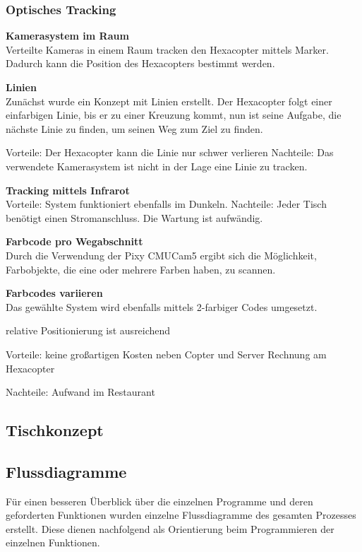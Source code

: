     \subsubsection{Optisches Tracking}


      \textbf{Kamerasystem im Raum}\\
      Verteilte Kameras in einem Raum tracken den Hexacopter mittels Marker. Dadurch kann die Position des Hexacopters bestimmt werden.


      \textbf{Linien}\\
      Zunächst wurde ein Konzept mit Linien erstellt. Der Hexacopter folgt einer einfarbigen Linie, bis er zu einer Kreuzung kommt, nun ist seine Aufgabe, die nächste Linie zu finden, um seinen Weg zum Ziel zu finden.

      Vorteile: Der Hexacopter kann die Linie nur schwer verlieren
      Nachteile: Das verwendete Kamerasystem ist nicht in der Lage eine Linie zu tracken.

      \textbf{Tracking mittels Infrarot}\\


      Vorteile:
      System funktioniert ebenfalls im Dunkeln.
      Nachteile:
      Jeder Tisch benötigt einen Stromanschluss.
      Die Wartung ist aufwändig.

      \textbf{Farbcode pro Wegabschnitt}\\
      Durch die Verwendung der Pixy CMUCam5 ergibt sich die Möglichkeit, Farbobjekte, die eine oder mehrere Farben haben, zu scannen.



      \textbf{Farbcodes variieren}\\
      Das gewählte System wird ebenfalls mittels 2-farbiger Codes umgesetzt.


      relative Positionierung ist ausreichend

      Vorteile:
      keine großartigen Kosten neben Copter und Server
      Rechnung am Hexacopter

      Nachteile:
      Aufwand im Restaurant



  \subsection{Tischkonzept}



  \subsection{Flussdiagramme}
  Für einen besseren Überblick über die einzelnen Programme und deren geforderten Funktionen wurden einzelne Flussdiagramme des gesamten Prozesses erstellt.
  Diese dienen nachfolgend als Orientierung beim Programmieren der einzelnen Funktionen.

